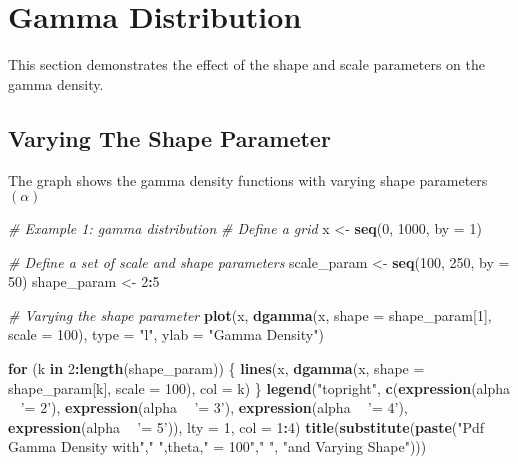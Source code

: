 \documentclass[]{book}
\newenvironment{Shaded}{\begin{snugshade}}{\end{snugshade}}
\newcommand{\KeywordTok}[1]{\textcolor[rgb]{0.13,0.29,0.53}{\textbf{#1}}}
\newcommand{\DataTypeTok}[1]{\textcolor[rgb]{0.13,0.29,0.53}{#1}}
\newcommand{\DecValTok}[1]{\textcolor[rgb]{0.00,0.00,0.81}{#1}}
\newcommand{\StringTok}[1]{\textcolor[rgb]{0.31,0.60,0.02}{#1}}
\newcommand{\CommentTok}[1]{\textcolor[rgb]{0.56,0.35,0.01}{\textit{#1}}}
\newcommand{\ControlFlowTok}[1]{\textcolor[rgb]{0.13,0.29,0.53}{\textbf{#1}}}
\newcommand{\OperatorTok}[1]{\textcolor[rgb]{0.81,0.36,0.00}{\textbf{#1}}}
\newcommand{\NormalTok}[1]{#1}
\theoremstyle{definition}
\theoremstyle{definition}
\theoremstyle{definition}
\theoremstyle{remark}
\begin{document}
\section{Gamma Distribution}\label{gamma-distribution}

This section demonstrates the effect of the shape and scale parameters
on the gamma density.

\subsection{Varying The Shape
Parameter}\label{varying-the-shape-parameter}

The graph shows the gamma density functions with varying shape
parameters \((\alpha)\)

\begin{Shaded}
\begin{Highlighting}[]
\CommentTok{# Example 1: gamma distribution}
\CommentTok{# Define a grid}
\NormalTok{x <-}\StringTok{ }\KeywordTok{seq}\NormalTok{(}\DecValTok{0}\NormalTok{, }\DecValTok{1000}\NormalTok{, }\DataTypeTok{by =} \DecValTok{1}\NormalTok{)}

\CommentTok{# Define a set of scale and shape parameters}
\NormalTok{scale_param <-}\StringTok{ }\KeywordTok{seq}\NormalTok{(}\DecValTok{100}\NormalTok{, }\DecValTok{250}\NormalTok{, }\DataTypeTok{by =} \DecValTok{50}\NormalTok{)}
\NormalTok{shape_param <-}\StringTok{ }\DecValTok{2}\OperatorTok{:}\DecValTok{5}

\CommentTok{# Varying the shape parameter}
\KeywordTok{plot}\NormalTok{(x, }\KeywordTok{dgamma}\NormalTok{(x, }\DataTypeTok{shape =}\NormalTok{ shape_param[}\DecValTok{1}\NormalTok{], }\DataTypeTok{scale =} \DecValTok{100}\NormalTok{), }\DataTypeTok{type =} \StringTok{"l"}\NormalTok{, }\DataTypeTok{ylab =} \StringTok{"Gamma Density"}\NormalTok{)}

\ControlFlowTok{for}\NormalTok{ (k }\ControlFlowTok{in} \DecValTok{2}\OperatorTok{:}\KeywordTok{length}\NormalTok{(shape_param)) \{}
  \KeywordTok{lines}\NormalTok{(x, }\KeywordTok{dgamma}\NormalTok{(x, }\DataTypeTok{shape =}\NormalTok{ shape_param[k], }\DataTypeTok{scale =} \DecValTok{100}\NormalTok{), }\DataTypeTok{col =}\NormalTok{ k)}
\NormalTok{\}}
\KeywordTok{legend}\NormalTok{(}\StringTok{"topright"}\NormalTok{, }\KeywordTok{c}\NormalTok{(}\KeywordTok{expression}\NormalTok{(alpha }\OperatorTok{~}\StringTok{ '= 2'}\NormalTok{), }\KeywordTok{expression}\NormalTok{(alpha }\OperatorTok{~}\StringTok{ '= 3'}\NormalTok{), }
                     \KeywordTok{expression}\NormalTok{(alpha }\OperatorTok{~}\StringTok{ '= 4'}\NormalTok{), }\KeywordTok{expression}\NormalTok{(alpha }\OperatorTok{~}\StringTok{ '= 5'}\NormalTok{)), }
       \DataTypeTok{lty =} \DecValTok{1}\NormalTok{, }\DataTypeTok{col =} \DecValTok{1}\OperatorTok{:}\DecValTok{4}\NormalTok{)}
\KeywordTok{title}\NormalTok{(}\KeywordTok{substitute}\NormalTok{(}\KeywordTok{paste}\NormalTok{(}\StringTok{"Pdf Gamma Density with"}\NormalTok{,}\StringTok{" "}\NormalTok{,theta,}\StringTok{" = 100"}\NormalTok{,}\StringTok{" "}\NormalTok{, }
                       \StringTok{"and Varying Shape"}\NormalTok{)))}
\end{Highlighting}
\end{Shaded}
\end{document}

